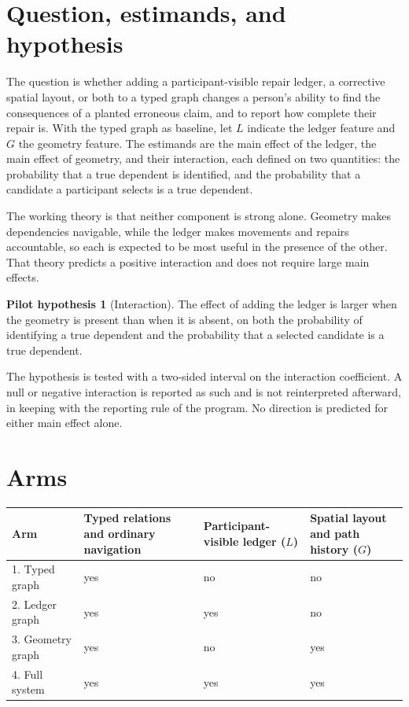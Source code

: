 \documentclass[11pt]{article}
\theoremstyle{definition}
\newtheorem{hypothesis}{Pilot hypothesis}
\begin{document}
\section{Question, estimands, and hypothesis}

The question is whether adding a participant-visible repair ledger, a corrective spatial layout, or both to a typed graph changes a person's ability to find the consequences of a planted erroneous claim, and to report how complete their repair is. With the typed graph as baseline, let $L$ indicate the ledger feature and $G$ the geometry feature. The estimands are the main effect of the ledger, the main effect of geometry, and their interaction, each defined on two quantities: the probability that a true dependent is identified, and the probability that a candidate a participant selects is a true dependent.

The working theory is that neither component is strong alone. Geometry makes dependencies navigable, while the ledger makes movements and repairs accountable, so each is expected to be most useful in the presence of the other. That theory predicts a positive interaction and does not require large main effects.

\begin{hypothesis}[Interaction]
The effect of adding the ledger is larger when the geometry is present than when it is absent, on both the probability of identifying a true dependent and the probability that a selected candidate is a true dependent.
\end{hypothesis}

The hypothesis is tested with a two-sided interval on the interaction coefficient. A null or negative interaction is reported as such and is not reinterpreted afterward, in keeping with the reporting rule of the program. No direction is predicted for either main effect alone.

\section{Arms}
\label{sec:arms}

\begin{table}[h]
\centering
\small
\begin{tabular}{@{}p{3.0cm}p{3.0cm}p{4.2cm}p{3.0cm}@{}}
\toprule
Arm & Typed relations and ordinary navigation & Participant-visible ledger ($L$) & Spatial layout and path history ($G$)\\
\midrule
1. Typed graph & yes & no & no\\
2. Ledger graph & yes & yes & no\\
3. Geometry graph & yes & no & yes\\
4. Full system & yes & yes & yes\\
\bottomrule
\end{tabular}
\end{table}
\end{document}
